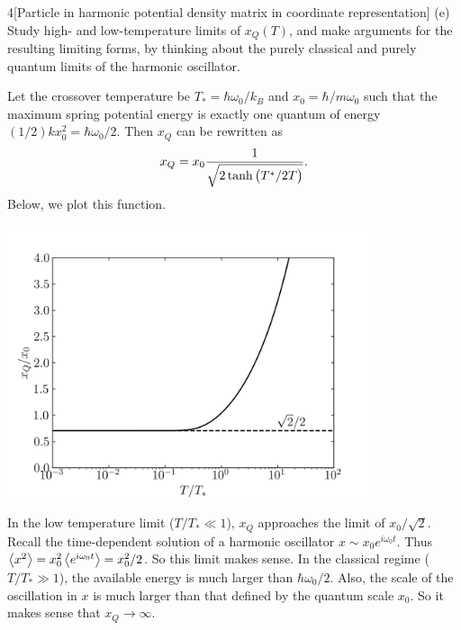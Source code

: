 \documentclass[12pt]{article}
\begin{document}
\begin{problem}{4}[Particle in harmonic potential density matrix in coordinate
    representation]
(e) Study high- and low-temperature limits of $x_Q(T)$, and make arguments for
the resulting limiting forms, by thinking about the purely classical and purely
quantum limits of the harmonic oscillator.
\begin{solution}
Let the crossover temperature be $T_\ast=\hbar\omega_0/k_B$ and
$x_0=\hbar/m\omega_0$ such that the maximum spring potential energy is exactly
one quantum of energy $(1/2)kx_0^2=\hbar\omega_0/2$. Then $x_Q$ can be rewritten
as
\begin{equation}
   x_Q=x_0\frac1{\sqrt{2\tanh\qty(T^\ast/2T)}} .
\end{equation}
Below, we plot this function.
\begin{center}
    \includegraphics[width=0.8\textwidth]{p4.png} 
\end{center}
In the low temperature limit ($T/T_\ast\ll 1$), $x_Q$ approaches the limit
of $x_0/\sqrt2$. Recall the time-dependent solution of
a harmonic oscillator $x\sim x_0e^{i\omega_0t}$. Thus
$\expval{x^2}=x_0^2\expval{e^{i\omega_0t}}=x_0^2/2$. So this limit makes sense.
In the classical regime ($T/T_\ast\gg1$), the available energy is much larger
than $\hbar\omega_0/2$. Also, the scale of the oscillation in $x$ is much larger
than that defined by the quantum scale $x_0$. So it makes sense that
$x_Q\to\infty$.
\end{solution}
\end{problem}
\newpage
\end{document}
